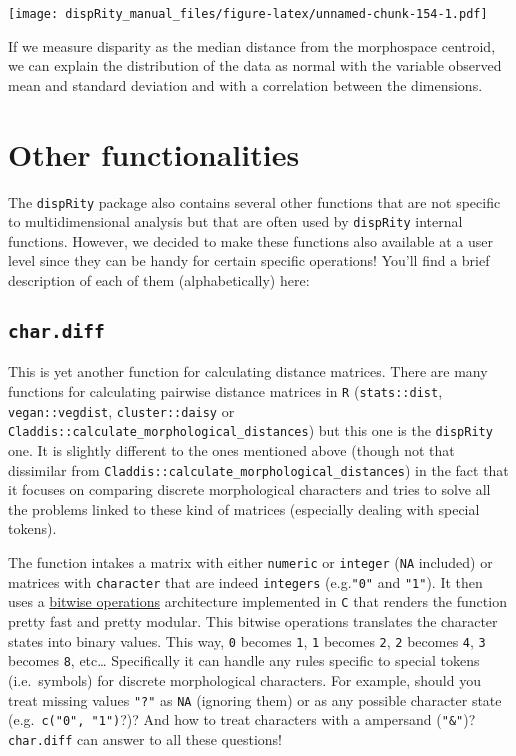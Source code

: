 \documentclass[
]{book}
\begin{document}
\texttt{[image: dispRity\_manual\_files/figure-latex/unnamed-chunk-154-1.pdf]}

If we measure disparity as the median distance from the morphospace centroid, we can explain the distribution of the data as normal with the variable observed mean and standard deviation and with a correlation between the dimensions.

\hypertarget{other-functionalities}{%
\chapter{Other functionalities}\label{other-functionalities}}

The \texttt{dispRity} package also contains several other functions that are not specific to multidimensional analysis but that are often used by \texttt{dispRity} internal functions.
However, we decided to make these functions also available at a user level since they can be handy for certain specific operations!
You'll find a brief description of each of them (alphabetically) here:

\hypertarget{char.diff}{%
\section{\texorpdfstring{\texttt{char.diff}}{char.diff}}\label{char.diff}}

This is yet another function for calculating distance matrices.
There are many functions for calculating pairwise distance matrices in \texttt{R} (\texttt{stats::dist}, \texttt{vegan::vegdist}, \texttt{cluster::daisy} or \texttt{Claddis::calculate\_morphological\_distances}) but this one is the \texttt{dispRity} one.
It is slightly different to the ones mentioned above (though not that dissimilar from \texttt{Claddis::calculate\_morphological\_distances}) in the fact that it focuses on comparing discrete morphological characters and tries to solve all the problems linked to these kind of matrices (especially dealing with special tokens).

The function intakes a matrix with either \texttt{numeric} or \texttt{integer} (\texttt{NA} included) or matrices with \texttt{character} that are indeed \texttt{integers} (e.g.\texttt{"0"} and \texttt{"1"}).
It then uses a \href{https://en.wikipedia.org/wiki/Bitwise_operations_in_C}{bitwise operations} architecture implemented in \texttt{C} that renders the function pretty fast and pretty modular.
This bitwise operations translates the character states into binary values.
This way, \texttt{0} becomes \texttt{1}, \texttt{1} becomes \texttt{2}, \texttt{2} becomes \texttt{4}, \texttt{3} becomes \texttt{8}, etc\ldots{}
Specifically it can handle any rules specific to special tokens (i.e.~symbols) for discrete morphological characters. For example, should you treat missing values \texttt{"?"} as \texttt{NA} (ignoring them) or as any possible character state (e.g.~\texttt{c("0",\ "1")}?)? And how to treat characters with a ampersand (\texttt{"\&"})? \texttt{char.diff} can answer to all these questions!
\end{document}
